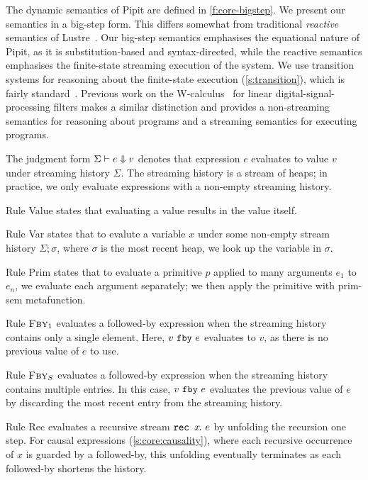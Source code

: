 The dynamic semantics of Pipit are defined in \autoref{f:core-bigstep}.
We present our semantics in a big-step form.
This differs somewhat from traditional \emph{reactive} semantics of Lustre~\cite{caspi1995functional}.
Our big-step semantics emphasises the equational nature of Pipit, as it is substitution-based and syntax-directed, while the reactive semantics emphasises the finite-state streaming execution of the system.
We use transition systems for reasoning about the finite-state execution (\autoref{s:transition}), which is fairly standard~\cite{brun2023equation,champion2016kind2,raymond2008synchronous}.
Previous work on the {\sc W-calculus}~\cite{gallego2021w} for linear digital-signal-processing filters makes a similar distinction and provides a non-streaming semantics for reasoning about programs and a streaming semantics for executing programs.


The judgment form $\Sigma \vdash e \Downarrow v$ denotes that expression $e$ evaluates to value $v$ under streaming history $\Sigma$.
The streaming history is a stream of heaps; in practice, we only evaluate expressions with a non-empty streaming history.

Rule {\sc Value} states that evaluating a value results in the value itself.

Rule {\sc Var} states that to evalute a variable $x$ under some non-empty stream history $\Sigma; \sigma$, where $\sigma$ is the most recent heap, we look up the variable in $\sigma$.

Rule {\sc Prim} states that to evaluate a primitive $p$ applied to many arguments $e_1$ to $e_n$, we evaluate each argument separately; we then apply the primitive with prim-sem metafunction.

Rule $\textsc{Fby}_1$ evaluates a followed-by expression when the streaming history contains only a single element.
Here, $v~\texttt{fby}~e$ evaluates to $v$, as there is no previous value of $e$ to use.

Rule $\textsc{Fby}_S$ evaluates a followed-by expression when the streaming history contains multiple entries.
In this case, $v~\texttt{fby}~e$ evaluates the previous value of $e$ by discarding the most recent entry from the streaming history.

Rule {\sc Rec} evaluates a recursive stream $\texttt{rec~} x\hspace{-0.1em}.~e$ by unfolding the recursion one step.
For causal expressions (\autoref{s:core:causality}), where each recursive occurrence of $x$ is guarded by a followed-by, this unfolding eventually terminates as each followed-by shortens the history.

